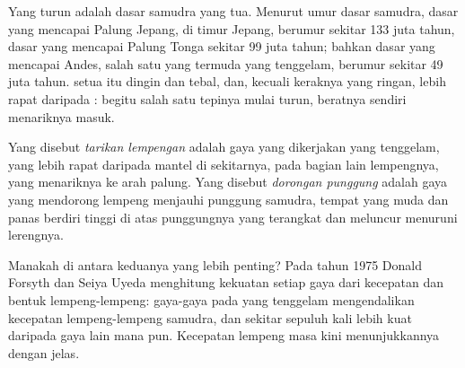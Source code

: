Yang turun adalah dasar samudra yang tua. Menurut umur dasar samudra, dasar yang
mencapai Palung Jepang, di timur Jepang, berumur sekitar 133 juta tahun, dasar
yang mencapai Palung Tonga sekitar 99 juta tahun; bahkan dasar yang mencapai
Andes, salah satu yang termuda yang tenggelam, berumur sekitar 49 juta tahun.
 setua itu dingin dan tebal, dan, kecuali keraknya yang ringan, lebih
rapat daripada : begitu salah satu tepinya mulai turun, beratnya
sendiri menariknya masuk.

\begin{definition}\label{def:g11:subduction-zones:slab-pull}
Yang disebut \emph{tarikan lempengan} adalah gaya yang
dikerjakan  yang tenggelam, yang lebih rapat daripada mantel di
sekitarnya, pada bagian lain lempengnya, yang menariknya ke arah palung. Yang
disebut \emph{dorongan punggung} adalah gaya yang
mendorong lempeng menjauhi punggung samudra, tempat  yang muda dan panas
berdiri tinggi di atas punggungnya yang terangkat dan meluncur menuruni lerengnya.
\end{definition}

Manakah di antara keduanya yang lebih penting? Pada tahun 1975 Donald Forsyth dan
Seiya Uyeda menghitung kekuatan setiap gaya dari kecepatan dan bentuk
lempeng-lempeng: gaya-gaya pada  yang tenggelam mengendalikan kecepatan
lempeng-lempeng samudra, dan sekitar sepuluh kali lebih kuat daripada gaya lain
mana pun. Kecepatan lempeng masa kini menunjukkannya dengan jelas.

